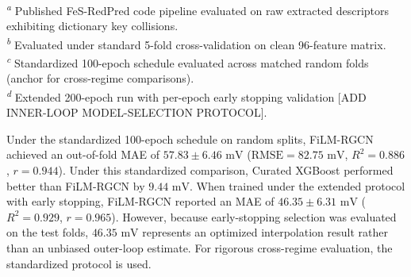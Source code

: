\documentclass[journal=jcisd8,manuscript=article]{achemso}
\begin{document}
\begin{table}[htbp]
\centering
\caption{Cross-Validation Performance on the Curated Fe--S Benchmark ($N=364$)}
\label{tab:benchmark_summary}
\vspace{1ex}
\raggedright
\footnotesize
\textsuperscript{\emph{a}} Published FeS-RedPred code pipeline\cite{persico2025predicting} evaluated on raw extracted descriptors exhibiting dictionary key collisions.\\
\textsuperscript{\emph{b}} Evaluated under standard 5-fold cross-validation on clean 96-feature matrix.\\
\textsuperscript{\emph{c}} Standardized 100-epoch schedule evaluated across matched random folds (anchor for cross-regime comparisons).\\
\textsuperscript{\emph{d}} Extended 200-epoch run with per-epoch early stopping validation [ADD INNER-LOOP MODEL-SELECTION PROTOCOL].
\end{table}

Under the standardized 100-epoch schedule on random splits, FiLM-RGCN achieved an out-of-fold MAE of $57.83 \pm 6.46\text{ mV}$ ($\text{RMSE} = 82.75\text{ mV}$, $R^2 = 0.886$, $r = 0.944$). Under this standardized comparison, Curated XGBoost performed better than FiLM-RGCN by $9.44\text{ mV}$. When trained under the extended protocol with early stopping, FiLM-RGCN reported an MAE of $46.35 \pm 6.31\text{ mV}$ ($R^2 = 0.929$, $r = 0.965$). However, because early-stopping selection was evaluated on the test folds, $46.35\text{ mV}$ represents an optimized interpolation result rather than an unbiased outer-loop estimate. For rigorous cross-regime evaluation, the standardized protocol is used.
\end{document}
